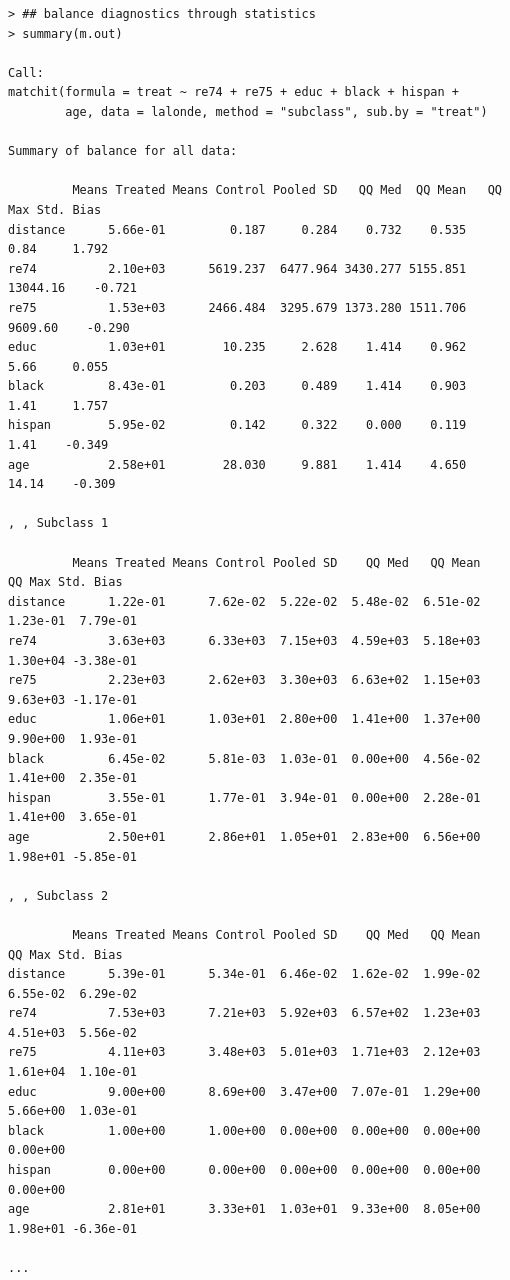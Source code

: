 \documentclass[oneside,letterpaper,titlepage]{article}
\begin{document}
\begin{verbatim}
> ## balance diagnostics through statistics
> summary(m.out)

Call:
matchit(formula = treat ~ re74 + re75 + educ + black + hispan +     
        age, data = lalonde, method = "subclass", sub.by = "treat")

Summary of balance for all data:

         Means Treated Means Control Pooled SD   QQ Med  QQ Mean   QQ Max Std. Bias
distance      5.66e-01         0.187     0.284    0.732    0.535     0.84     1.792
re74          2.10e+03      5619.237  6477.964 3430.277 5155.851 13044.16    -0.721
re75          1.53e+03      2466.484  3295.679 1373.280 1511.706  9609.60    -0.290
educ          1.03e+01        10.235     2.628    1.414    0.962     5.66     0.055
black         8.43e-01         0.203     0.489    1.414    0.903     1.41     1.757
hispan        5.95e-02         0.142     0.322    0.000    0.119     1.41    -0.349
age           2.58e+01        28.030     9.881    1.414    4.650    14.14    -0.309
        
, , Subclass 1

         Means Treated Means Control Pooled SD    QQ Med   QQ Mean    QQ Max Std. Bias
distance      1.22e-01      7.62e-02  5.22e-02  5.48e-02  6.51e-02  1.23e-01  7.79e-01
re74          3.63e+03      6.33e+03  7.15e+03  4.59e+03  5.18e+03  1.30e+04 -3.38e-01
re75          2.23e+03      2.62e+03  3.30e+03  6.63e+02  1.15e+03  9.63e+03 -1.17e-01
educ          1.06e+01      1.03e+01  2.80e+00  1.41e+00  1.37e+00  9.90e+00  1.93e-01
black         6.45e-02      5.81e-03  1.03e-01  0.00e+00  4.56e-02  1.41e+00  2.35e-01
hispan        3.55e-01      1.77e-01  3.94e-01  0.00e+00  2.28e-01  1.41e+00  3.65e-01
age           2.50e+01      2.86e+01  1.05e+01  2.83e+00  6.56e+00  1.98e+01 -5.85e-01
        
, , Subclass 2

         Means Treated Means Control Pooled SD    QQ Med   QQ Mean    QQ Max Std. Bias
distance      5.39e-01      5.34e-01  6.46e-02  1.62e-02  1.99e-02  6.55e-02  6.29e-02
re74          7.53e+03      7.21e+03  5.92e+03  6.57e+02  1.23e+03  4.51e+03  5.56e-02
re75          4.11e+03      3.48e+03  5.01e+03  1.71e+03  2.12e+03  1.61e+04  1.10e-01
educ          9.00e+00      8.69e+00  3.47e+00  7.07e-01  1.29e+00  5.66e+00  1.03e-01
black         1.00e+00      1.00e+00  0.00e+00  0.00e+00  0.00e+00  0.00e+00          
hispan        0.00e+00      0.00e+00  0.00e+00  0.00e+00  0.00e+00  0.00e+00          
age           2.81e+01      3.33e+01  1.03e+01  9.33e+00  8.05e+00  1.98e+01 -6.36e-01
        
...
\end{verbatim}
\end{document}
